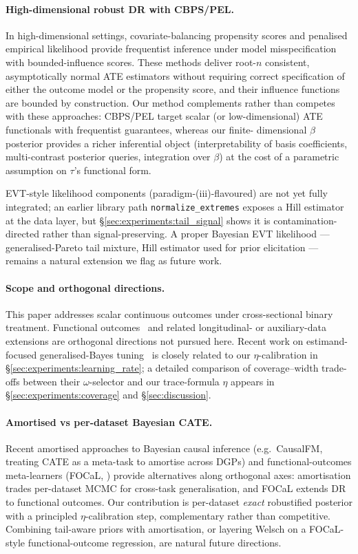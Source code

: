 \paragraph{High-dimensional robust DR with CBPS/PEL.}
In high-dimensional settings, covariate-balancing propensity scores
\citep[CBPS;][]{imai2014cbps} and penalised empirical likelihood
\citep[PEL;][]{tan2020pel} provide frequentist inference under
model misspecification with bounded-influence scores. These methods
deliver root-$n$ consistent, asymptotically normal ATE estimators
without requiring correct specification of either the outcome model
or the propensity score, and their influence functions are bounded
by construction. Our method complements rather than competes with
these approaches: CBPS/PEL target scalar (or low-dimensional) ATE
functionals with frequentist guarantees, whereas our finite-
dimensional $\beta$ posterior provides a richer inferential object
(interpretability of basis coefficients, multi-contrast posterior
queries, integration over $\beta$) at the cost of a parametric
assumption on $\tau$'s functional form.

EVT-style likelihood components (paradigm-(iii)-flavoured) are not
yet fully integrated; an earlier library path
\texttt{normalize\_extremes} exposes a Hill estimator at the data
layer, but \S\ref{sec:experiments:tail_signal} shows it is
contamination-directed rather than signal-preserving. A proper
Bayesian EVT likelihood --- generalised-Pareto tail mixture, Hill
estimator used for prior elicitation --- remains a natural
extension we flag as future work.

\paragraph{Scope and orthogonal directions.}
This paper addresses scalar continuous outcomes under cross-sectional
binary treatment. Functional outcomes~\citep{salmaso2026focal} and
related longitudinal- or auxiliary-data extensions are orthogonal
directions not pursued here. Recent work on estimand-focused
generalised-Bayes tuning~\citep{alexopoulos2025rbci} is closely related to our
$\eta$-calibration in
\S\ref{sec:experiments:learning_rate}; a detailed comparison
of coverage--width trade-offs between their $\omega$-selector and
our trace-formula $\eta$ appears in
\S\ref{sec:experiments:coverage} and
\S\ref{sec:discussion}.

\paragraph{Amortised vs per-dataset Bayesian CATE.}
Recent amortised approaches to Bayesian causal inference (e.g.\
CausalFM, treating CATE as a meta-task to amortise across DGPs) and
functional-outcomes meta-learners (FOCaL,
\citealp{salmaso2026focal}) provide alternatives along orthogonal axes:
amortisation trades per-dataset MCMC for cross-task generalisation,
and FOCaL extends DR to functional outcomes. Our contribution is
per-dataset \emph{exact} robustified posterior with a principled
$\eta$-calibration step, complementary rather than competitive.
Combining tail-aware priors with amortisation, or layering Welsch
on a FOCaL-style functional-outcome regression, are natural future
directions.
